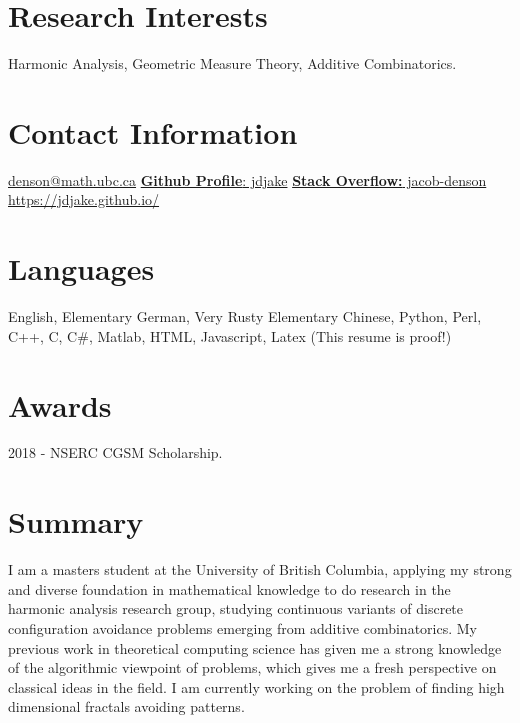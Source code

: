 \documentclass{friggeri-cv}
\newenvironment{changemargin}[2]{%
\begin{list}{}{%
\setlength{\topsep}{0pt}%
\setlength{\leftmargin}{#1}%
\setlength{\rightmargin}{#2}%
\setlength{\listparindent}{\parindent}%
\setlength{\itemindent}{\parindent}%
\setlength{\parsep}{\parskip}%
}%
\item[]}{\end{list}}
\begin{document}


\begin{aside} %
\section{Research Interests}
Harmonic Analysis, Geometric Measure Theory, Additive Combinatorics.
\section{Contact Information}
\href{mailto:denson@math.ubc.ca}{denson@math.ubc.ca}
\href{https://github.com/jdjake}{{\bf Github Profile}: jdjake}
\href{http://stackoverflow.com/users/2601483/jacob-denson}{{\bf Stack Overflow:} jacob-denson}
\href{https://jdjake.github.io/}{https://jdjake.github.io/}
\section{Languages}
English, Elementary German, Very Rusty Elementary Chinese, Python, Perl, C++, C, C\#, Matlab, HTML, Javascript, Latex (This resume is proof!)
\section{Awards}
2018 - NSERC CGSM Scholarship.
\end{aside}



\section{Summary}

I am a masters student at the University of British Columbia, applying my strong and diverse foundation in mathematical knowledge to do research in the harmonic analysis research group, studying continuous variants of discrete configuration avoidance problems emerging from additive combinatorics. My previous work in theoretical computing science has given me a strong knowledge of the algorithmic viewpoint of problems, which gives me a fresh perspective on classical ideas in the field. I am currently working on the problem of finding high dimensional fractals avoiding patterns.
\end{document}
